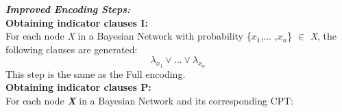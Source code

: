         \noindent \textbf{\textit{Improved Encoding Steps:}}\\
        \textbf{Obtaining indicator clauses \textsc{I}:}\\
        For each node \textit{X} in a Bayesian Network with probability \{$x_{1}$,... ,$x_{n}$\} $\in$ \textit{X}, the following clauses are generated:
        \begin{equation}\label{Improvedenc_ic}
            \lambda_{x_{1}} \vee ... \vee \lambda_{x_{n}}
        \end{equation}
        This step is the same as the Full encoding.\\

        \noindent \textbf{Obtaining indicator clauses \textsc{P}:}\\
        For each node \textbf{\textit{X}} in a Bayesian Network and its corresponding CPT:
